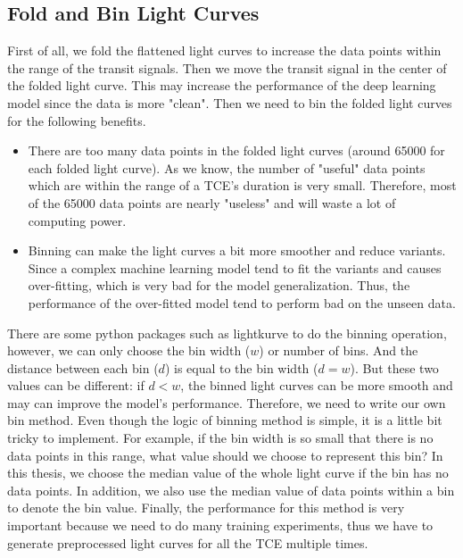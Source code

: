     \subsection{Fold and Bin Light Curves}
      First of all, we fold the flattened light curves to increase the data points within 
      the range of the transit signals. Then we move the transit signal in the center 
      of the folded light curve. This may increase the performance of the deep learning model 
      since the data is more "clean". Then we need to bin the folded light curves for the 
      following benefits. 
      \begin{itemize}
        \item There are too many data points in the folded light curves 
          (around 65000 for each folded light curve). 
          As we know, the number of "useful" data points which are within the range of a 
          TCE's duration is very small. Therefore, most of the 65000 data points are 
          nearly "useless" and will waste a lot of computing power. 
        \item Binning can make the light curves a bit more smoother and reduce variants.
          Since a complex machine learning model tend to fit the variants and causes
          over-fitting, which is very bad for the model generalization. Thus, the performance
          of the over-fitted model tend to perform bad on the unseen data.
      \end{itemize}

      There are some python packages such as lightkurve to do the binning operation, however, 
      we can only choose the bin width ($w$) or number of bins. And the distance between 
      each bin ($d$) is equal to the bin width ($d=w$). But these two values can be different:
      if $d<w$, the binned light curves can be more smooth and may can improve the model's 
      performance. Therefore, we need to write our own bin method. Even though the logic 
      of binning method is simple, it is a little bit tricky to implement. For example, 
      if the bin width is so small that there is no data points in this range, what value 
      should we choose to 
      represent this bin? In this thesis, we choose the median value of the whole light curve 
      if the bin has no data points. In addition, we also use the median value of data points 
      within a bin to denote the bin value. 
      Finally, the performance for 
      this method is very important because we need to do 
      many training experiments, thus we have to generate preprocessed light curves for all 
      the TCE multiple times. 

